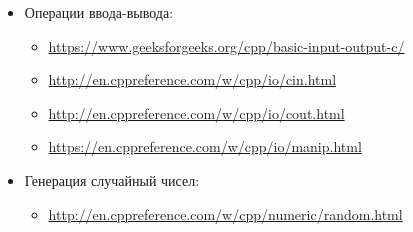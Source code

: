 \documentclass[14pt]{extarticle}
\begin{document}
    \begin{itemize}

        \item Операции ввода-вывода:

            \begin{itemize}

                \item \url{https://www.geeksforgeeks.org/cpp/basic-input-output-c/}

                \item \url{http://en.cppreference.com/w/cpp/io/cin.html}

                \item \url{http://en.cppreference.com/w/cpp/io/cout.html}

                \item \url{https://en.cppreference.com/w/cpp/io/manip.html}
                
            \end{itemize}

        \item Генерация случайный чисел:

            \begin{itemize}

                \item \url{http://en.cppreference.com/w/cpp/numeric/random.html}
                
            \end{itemize}
        
    \end{itemize}
\end{document}
